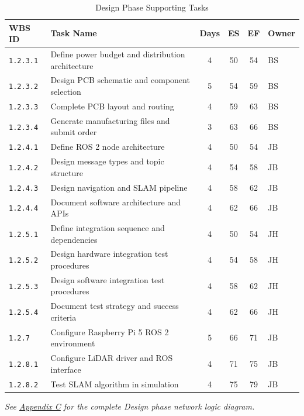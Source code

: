 \begin{table}[H]
\centering
\small
{}
\begin{tabular}{|l|p{5cm}|c|c|c|l|}
\hline
\rowcolor{designyellow!40}
\textbf{WBS ID} & \textbf{Task Name} & \textbf{Days} & \textbf{ES} & \textbf{EF} & \textbf{Owner} \\
\hline
\texttt{1.2.3.1} & Define power budget and distribution architecture & 4 & 50 & 54 & BS \\
\hline
\texttt{1.2.3.2} & Design PCB schematic and component selection & 5 & 54 & 59 & BS \\
\hline
\texttt{1.2.3.3} & Complete PCB layout and routing & 4 & 59 & 63 & BS \\
\hline
\texttt{1.2.3.4} & Generate manufacturing files and submit order & 3 & 63 & 66 & BS \\
\hline
\texttt{1.2.4.1} & Define ROS 2 node architecture & 4 & 50 & 54 & JB \\
\hline
\texttt{1.2.4.2} & Design message types and topic structure & 4 & 54 & 58 & JB \\
\hline
\texttt{1.2.4.3} & Design navigation and SLAM pipeline & 4 & 58 & 62 & JB \\
\hline
\texttt{1.2.4.4} & Document software architecture and APIs & 4 & 62 & 66 & JB \\
\hline
\texttt{1.2.5.1} & Define integration sequence and dependencies & 4 & 50 & 54 & JH \\
\hline
\texttt{1.2.5.2} & Design hardware integration test procedures & 4 & 54 & 58 & JH \\
\hline
\texttt{1.2.5.3} & Design software integration test procedures & 4 & 58 & 62 & JH \\
\hline
\texttt{1.2.5.4} & Document test strategy and success criteria & 4 & 62 & 66 & JH \\
\hline
\texttt{1.2.7} & Configure Raspberry Pi 5 ROS 2 environment & 5 & 66 & 71 & JB \\
\hline
\texttt{1.2.8.1} & Configure LiDAR driver and ROS interface & 4 & 71 & 75 & JB \\
\hline
\texttt{1.2.8.2} & Test SLAM algorithm in simulation & 4 & 75 & 79 & JB \\
\hline
\end{tabular}
\caption{Design Phase Supporting Tasks}
\label{tab:nld_design_supporting}
\end{table}

\noindent\textit{See \hyperref[app:nld]{Appendix C} for the complete Design phase network logic diagram.}
